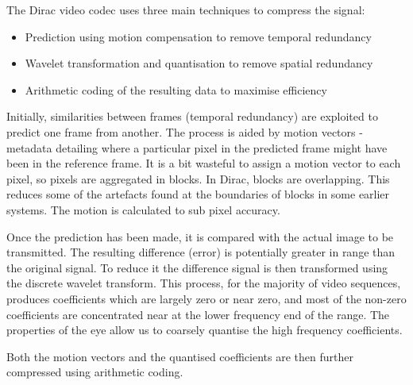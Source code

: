 The Dirac video codec uses three main techniques to compress the signal:

\begin{itemize}
    \item Prediction using motion compensation to remove temporal redundancy
    \item Wavelet transformation and quantisation to remove spatial redundancy
    \item Arithmetic coding of the resulting data to maximise efficiency
\end{itemize}


Initially, similarities between frames (temporal redundancy) are
exploited to predict one frame from another. The process is aided by
motion vectors - metadata detailing where a particular pixel in the
predicted frame might have been in the reference frame. It is a bit
wasteful to assign a motion vector to each pixel, so pixels are
aggregated in blocks. In Dirac, blocks are overlapping. This reduces
some of the artefacts found at the boundaries of blocks in some earlier
systems. The motion is calculated to sub pixel accuracy.

Once the prediction has been made, it is compared with the actual image
to be transmitted.  The resulting difference (error) is potentially
greater in range than the original signal. To reduce it the difference
signal is then transformed using the discrete wavelet transform. This
process, for the majority of video sequences, produces coefficients
which are largely zero or near zero, and most of the non-zero
coefficients are concentrated near at the lower frequency end of the
range. The properties of the eye allow us to coarsely quantise the high
frequency coefficients.

Both the motion vectors and the quantised coefficients are then further
compressed using arithmetic coding.
